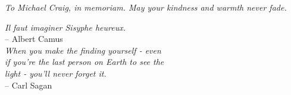 \clearpage
\hspace{0pt}
\vspace{7cm}
\begin{center}
\textit{To Michael Craig, in memoriam. May your kindness and warmth never fade.}
\end{center}


\clearpage
\hspace{0pt}
\vspace{6cm}

\begin{flushright}

\textit{Il faut imaginer Sisyphe heureux.}\\
-- Albert Camus\\
\vspace{2cm}
\textit{When you make the finding yourself - even\\ if you're the last person on Earth to see the\\ light - you'll never forget it.}\\
-- Carl Sagan
\end{flushright}
